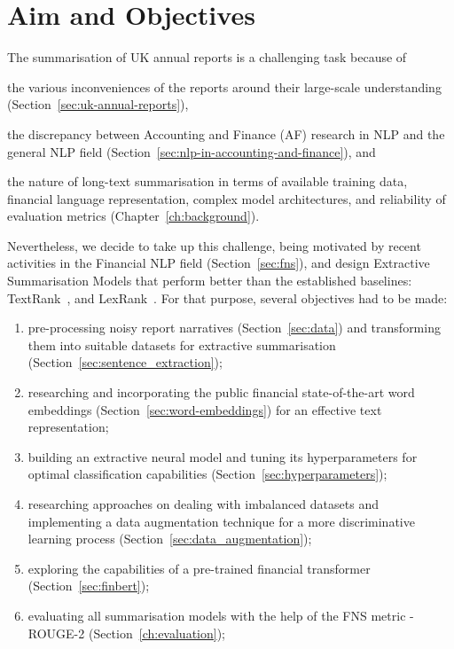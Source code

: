 \section{Aim and Objectives}\label{sec:aim-and-objectives}
The summarisation of UK annual reports is a challenging task because of
 \begin{enumerate*}
     \item the various inconveniences of the reports around their large-scale understanding (Section~\ref{sec:uk-annual-reports}),
     \item the discrepancy between Accounting and Finance (AF) research in NLP and the general NLP field (Section~\ref{sec:nlp-in-accounting-and-finance}), and
     \item the nature of long-text summarisation in terms of available training data, financial language representation, complex model architectures, and reliability of evaluation metrics (Chapter~\ref{ch:background}).
 \end{enumerate*}
 Nevertheless, we decide to take up this challenge, being motivated by recent activities in the Financial NLP field
(Section~\ref{sec:fns}), and design Extractive Summarisation Models that perform better than the established baselines: TextRank~\cite{mihalcea-tarau-2004-textrank}, and LexRank~\cite{Erkan2004LexRankGC}.
 For that purpose, several objectives had to be made:
 \begin{enumerate}
     \item pre-processing noisy report narratives (Section~\ref{sec:data}) and transforming them into suitable datasets for extractive summarisation (Section~\ref{sec:sentence_extraction});
     \item researching and incorporating the public financial state-of-the-art word embeddings (Section~\ref{sec:word-embeddings}) for an effective text representation;
     \item building an extractive neural model and tuning its hyperparameters for optimal classification capabilities (Section~\ref{sec:hyperparameters});
     \item researching approaches on dealing with imbalanced datasets and implementing a data augmentation technique for a more discriminative learning process (Section~\ref{sec:data_augmentation});
     \item exploring the capabilities of a pre-trained financial transformer (Section~\ref{sec:finbert});
     \item evaluating all summarisation models with the help of the FNS metric - ROUGE-2 (Section~\ref{ch:evaluation});
 \end{enumerate}